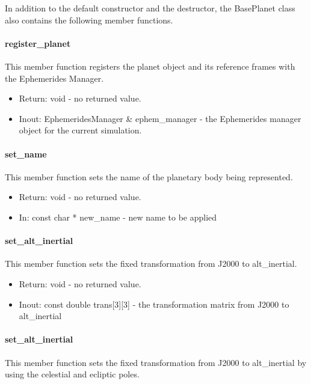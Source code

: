 In addition to the default constructor and the destructor,
the BasePlanet class also contains the following member functions.

\paragraph{register\_planet}

This member function registers the planet object and its reference frames
with the Ephemerides Manager.

\begin{itemize}
\item{Return:} void - no returned value.
\item{Inout:} EphemeridesManager \& ephem\_manager - the Ephemerides manager
object for the current simulation.
\end{itemize}

\paragraph{set\_name}

This member function sets the name of the planetary body being represented.

\begin{itemize}
\item{Return:} void - no returned value.
\item{In:} const char * new\_name - new name to be applied
\end{itemize}

\paragraph{set\_alt\_inertial}

This member function sets the fixed transformation from J2000 to alt\_inertial.

\begin{itemize}
\item{Return:} void - no returned value.
\item{Inout:} const double trans[3][3] - the transformation matrix from J2000
to alt\_inertial
\end{itemize}

\paragraph{set\_alt\_inertial}

This member function sets the fixed transformation from J2000 to alt\_inertial
by using the celestial and ecliptic poles.

